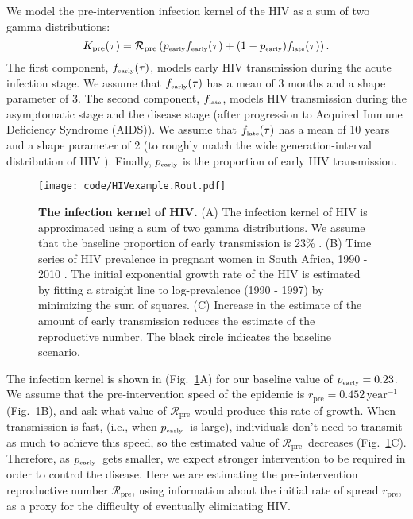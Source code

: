 \documentclass[12pt]{article}
\newcommand{\RR}{\ensuremath{{\mathcal R}}}
\newcommand{\Rx}[1]{\ensuremath{\RR_{\mathrm{#1}}}}
\newcommand{\Rpre}{\Rx{pre}}
\newcommand{\KK}{\ensuremath{{K}}}
\newcommand{\Kx}[1]{\ensuremath{\KK_{\mathrm{#1}}}}
\newcommand{\Kpre}{\Kx{pre}}
\newcommand{\rr}{\ensuremath{{r}}}
\newcommand{\rx}[1]{\ensuremath{\rr_{\mathrm{#1}}}}
\newcommand{\rpre}{\rx{pre}}
\newcommand{\tsub}[2]{#1_{{\textrm{\tiny #2}}}}
\newcommand{\pEarly}{\ensuremath{\tsub{p}{early}}}
\newcommand{\figref}[1]{Fig.~\ref{fig:#1}}
\newcommand{\figlab}[1]{\label{fig:#1}}
\begin{document}
We model the pre-intervention infection kernel of the HIV as a sum of two gamma distributions:
\begin{equation}
\Kpre(\tau) = \Rpre \left(\tsub{p}{early} \tsub{f}{early}(\tau) + (1-\tsub{p}{early}) \tsub{f}{late}(\tau) \right).
\end{equation}
The first component, $\tsub{f}{early}(\tau)$, models early HIV transmission during the acute infection stage.
We assume that $\tsub{f}{early}(\tau)$ has a mean of 3 months \citep{hollingsworth2008hiv} and a shape parameter of 3.
The second component, $\tsub{f}{late}$, models HIV transmission during the asymptomatic stage and the disease stage (after progression to Acquired Immune Deficiency Syndrome (AIDS)).
We assume that $\tsub{f}{late}(\tau)$ has a mean of 10 years \citep{brookmeyer1989censoring, nishiura2019estimating} and a shape parameter of 2 (to roughly match the wide generation-interval distribution of HIV \citep{fraser2004factors}).
Finally, $\tsub{p}{early}$ is the proportion of early HIV transmission.

\begin{figure}[!th]
\texttt{[image: code/HIVexample.Rout.pdf]}
\caption{
\textbf{The infection kernel of HIV.}
(A) The infection kernel of HIV is approximated using a sum of two gamma distributions. We assume that the baseline proportion of early transmission is 23\% \citep{hayes2006amplified}.
(B) Time series of HIV prevalence in pregnant women in South Africa, 1990 - 2010 \citep{barron2013eliminating}. The initial exponential growth rate of the HIV is estimated by fitting a straight line to log-prevalence (1990 - 1997) by minimizing the sum of squares.
(C) Increase in the estimate of the amount of early transmission reduces the estimate of the reproductive number.
The black circle indicates the baseline scenario.
}
\figlab{example}
\end{figure}

The infection kernel is shown in (\figref{example}A) for our baseline value of  
$\tsub{p}{early} = 0.23$. We assume that the pre-intervention speed of the epidemic is $\rpre=0.452\,\mathrm{year}^{-1}$(\figref{example}B), and ask what value of $\Rpre$ would produce this rate of growth.
When transmission is fast, (i.e., when \pEarly\ is large), individuals don't need to transmit as much to achieve this speed, so the estimated value of \Rpre\ decreases (\figref{example}C).
Therefore, as \pEarly\ gets smaller, we expect stronger intervention to be required in order to control the disease.
Here we are estimating the pre-intervention reproductive number \Rpre, using information about the initial rate of spread \rpre, as a proxy for the difficulty of eventually eliminating HIV. 
\end{document}
